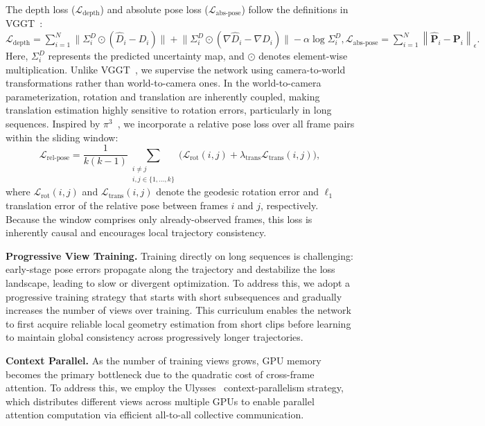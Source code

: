 \noindent The depth loss ($\mathcal{L}_{\text{depth}}$) and absolute pose loss ($\mathcal{L}_{\text{abs-pose}}$)
follow the definitions in VGGT~\cite{wang2025vggt}: 
$
  \mathcal{L}_{\text{depth}}
= \sum_{i=1}^{N} \Big\|
\Sigma_i^{D} \odot (\hat{D}_i - D_i) \Big\|
  + \Big\| \Sigma_i^{D} \odot (\nabla \hat{D}_i - \nabla D_i) \Big\|
  - \alpha \log \Sigma_i^{D},
  \mathcal{L}_{\text{abs-pose}}
= \sum_{i=1}^{N} \left\lVert \hat{\mathbf{P}}_{i} - \mathbf{P}_{i} \right\rVert_{\epsilon}.
$
Here, $\Sigma_i^{D}$ represents the predicted uncertainty map, and $\odot$ denotes element-wise multiplication.
Unlike VGGT~\cite{wang2025vggt}, we supervise the network using camera-to-world transformations rather than world-to-camera ones. In the world-to-camera parameterization, rotation and translation are inherently coupled, making translation estimation highly sensitive to rotation errors, particularly in long sequences.
Inspired by $\pi^3$~\cite{wang2025pi}, we incorporate a relative pose loss over all frame pairs within the sliding window:
\begin{equation}
  \mathcal{L}_{\text{rel-pose}}
= \frac{1}{k (k - 1)}
  \sum_{\substack{i \neq j \\ i,j \in \{1,\ldots,k\}}} \bigl(
    \mathcal{L}_{\text{rot}}(i,j)
    + \lambda_{\text{trans}} \mathcal{L}_{\text{trans}}(i,j)
  \bigr),
\end{equation}
where $\mathcal{L}_{\text{rot}}(i,j)$ and $\mathcal{L}_{\text{trans}}(i,j)$ denote the geodesic rotation error and $\ell_1$ translation error of the relative pose between frames $i$ and $j$, respectively.
Because the window comprises only already-observed frames, this loss is inherently causal and encourages local trajectory consistency.


\noindent\textbf{Progressive View Training.}
Training directly on long sequences is challenging: early-stage pose errors propagate along the trajectory and destabilize the loss landscape, leading to slow or divergent optimization.
To address this, we adopt a progressive training strategy that starts with short subsequences and gradually increases the number of views over training.
This curriculum enables the network to first acquire reliable local geometry estimation from short clips before learning to maintain global consistency across progressively longer trajectories.

\noindent\textbf{Context Parallel.}
As the number of training views grows, GPU memory becomes the primary bottleneck due to the quadratic cost of cross-frame attention.
To address this, we employ the Ulysses~\cite{jacobs2023deepspeed} context-parallelism strategy, which distributes different views across multiple GPUs to enable parallel attention computation via efficient all-to-all collective communication.



